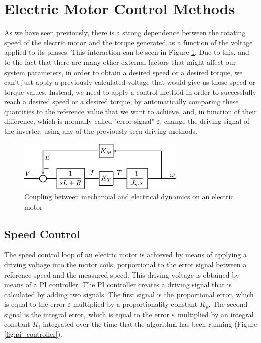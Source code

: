 \section{Electric Motor Control Methods}

As we have seen previously, there is a strong dependence between the rotating speed of the electric motor and the torque generated as a function of the voltage applied to its phases. This interaction can be seen in Figure \ref{fig:ele_mech_dyn}. Due to this, and to the fact that there are many other external factors that might affect our system parameters, in order to obtain a desired speed or a desired torque, we can't just apply a previously calculated voltage that would give us those speed or torque values. Instead, we need to apply a control method in order to successfully reach a desired speed or a desired torque, by automatically comparing these quantities to the reference value that we want to achieve, and, in function of their difference, which is normally called "error signal" $\varepsilon$, change the driving signal of the inverter, using any of the previously seen driving methods.

\begin{figure}[htbp]
\centering
\includegraphics[width=8cm]{Images/ele_mech_dyn.png} 
\caption[Electromechanical Dynamics Coupling]{Coupling between mechanical and electrical dynamics on an electric motor}
\label{fig:ele_mech_dyn}
\end{figure}

\subsection{Speed Control}

The speed control loop of an electric motor is achieved by means of applying a driving voltage into the motor coils, porportional to the error signal between a reference speed and the measured speed. This driving voltage is obtained by means of a \acf{PI} controller. The \ac{PI} controller creates a driving signal that is calculated by adding two signals. The first signal is the proportional error, which is equal to the error $\varepsilon$ multiplied by a proportionality constant $K_{p}$. The second signal is the integral error, which is equal to the error $\varepsilon$ multiplied by an integral constant $K_{i}$ integrated over the time that the algorithm has been running (Figure \ref{fig:pi_controller}).

